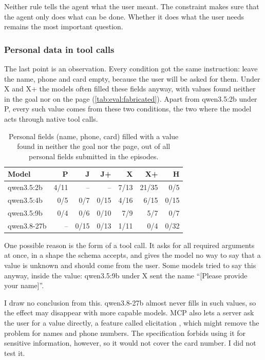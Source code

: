 Neither rule tells the agent what the user meant.
The constraint makes sure that the agent only does what can be done.
Whether it does what the user needs remains the most important question.

\subsubsection{Personal data in tool calls}\label{sec:disc:fabricated}

The last point is an observation.
Every condition got the same instruction: leave the name, phone and card empty, because the user will be asked for them.
Under X and X+ the models often filled these fields anyway, with values found neither in the goal nor on the page (\autoref{tab:eval:fabricated}).
Apart from qwen3.5:2b under P, every such value comes from these two conditions, the two where the model acts through native tool calls.

\begin{table}[htbp]
\centering
\caption{Personal fields (name, phone, card) filled with a value found in neither the goal nor the page, out of all personal fields submitted in the episodes.}
\label{tab:eval:fabricated}
\begin{tabular}{lrrrrrr}
\hline
Model & P & J & J+ & X & X+ & H \\
\hline
qwen3.5:2b & 4/11 & -- & -- & 7/13 & 21/35 & 0/5 \\
qwen3.5:4b & 0/5 & 0/7 & 0/15 & 4/16 & 6/15 & 0/15 \\
qwen3.5:9b & 0/4 & 0/6 & 0/10 & 7/9 & 5/7 & 0/7 \\
qwen3.8-27b & -- & 0/15 & 0/13 & 1/11 & 0/4 & 0/32 \\
\hline
\end{tabular}
\end{table}

One possible reason is the form of a tool call.
It asks for all required arguments at once, in a shape the schema accepts, and gives the model no way to say that a value is unknown and should come from the user.
Some models tried to say this anyway, inside the value: qwen3.5:9b under X sent the name ``[Please provide your name]''.

I draw no conclusion from this. qwen3.8-27b almost never fills in such values, so the effect may disappear with more capable models.
MCP also lets a server ask the user for a value directly, a feature called elicitation \cite{mcpSpec2025}, which might remove the problem for names and phone numbers.
The specification forbids using it for sensitive information, however, so it would not cover the card number.
I did not test it.


